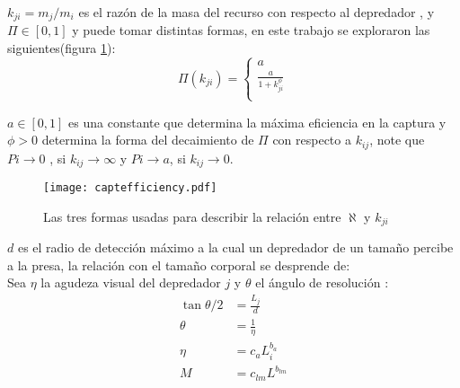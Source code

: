 $k_{ji}= m_j/m_i$ es el raz\'on de la masa del recurso con respecto al depredador , y $\Pi \in [0,1]$ y  puede tomar distintas formas\citep{weitz2006size}, en este trabajo se exploraron las siguientes(figura \ref{fig:efficiency}): 
\begin{equation}\label{eq:sr}
\Pi(k_{ji}) =
\begin{cases}
a\\
\frac{a}{1+k_{ji}^\phi} \\
\end{cases}
\end{equation}

$a \in [0,1] $ es una constante que determina la m\'axima eficiencia en la captura y $\phi > 0 $ determina la forma del decaimiento de $\Pi$ con respecto a $k_{ij}$, note que $Pi \to 0$ , si $k_{ij} \to \infty$ y $Pi \to a $, si $k_{ij} \to 0$.

\begin{figure}
\begin{center}
 \texttt{[image: captefficiency.pdf]}
 \caption[formas para $\aleph$]{Las tres formas usadas para describir la relaci\'on entre $\aleph$ y $k_{ji}$}
 \label{fig:efficiency} 
\end{center}
\end{figure}

$d$ es el radio de detecci\'on m\'aximo a la cual un depredador de un tama\~no percibe a la presa, la relaci\'on con el tama\~no corporal se desprende de:\\ Sea $\eta$ la agudeza visual del depredador $j$ y $\theta$ el \'angulo de resoluci\'on :
\begin{equation}\label{eq:d}
\begin{aligned}
\tan{\theta/2} &= \frac{L_{j}}{d} \\
\theta &= \frac{1}{\eta} \\
\eta & = c_a L_i^{b_a} \\
M &= c_{lm}L^{b_{lm}} 
\end{aligned}
\end{equation}
